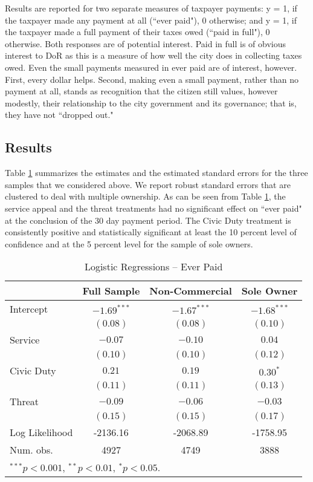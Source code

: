 \documentclass[12pt,titlepage]{article}
\begin{document}
Results are reported for two separate measures of taxpayer payments: y
= 1, if the taxpayer made any payment at all (``ever paid"), 0
otherwise; and y = 1, if the taxpayer made a full payment of their
taxes owed (``paid in full"), 0 otherwise.  Both responses are of
potential interest.  Paid in full is of obvious interest to DoR as
this is a measure of how well the city does in collecting taxes owed.
Even the small payments measured in ever paid are of interest,
however.  First, every dollar helps.  Second, making even a small
payment, rather than no payment at all, stands as recognition that the
citizen still values, however modestly, their relationship to the city
government and its governance; that is, they have not ``dropped out."

\subsection{Results}
  
Table \ref{XX} summarizes the estimates and the estimated standard
errors for the three samples that we considered above. We report robust
standard errors that are clustered to deal with multiple ownership. As
can be seen from Table \ref{XX}, the service appeal and the threat treatments
had no significant effect on ``ever paid" at the conclusion of the 30 day payment period.  The Civic Duty treatment is consistently positive and statistically significant at least the 10 percent level of confidence and at the 5 percent level for the sample of sole owners.  

  
\begin{table}[htbp]
\caption{Logistic Regressions -- Ever Paid}\label{XX}
\begin{center}
\begin{tabular}{| l |  c | c | c |}
\hline
               & Full Sample & Non-Commercial & Sole Owner \\
\hline
Intercept      & $-1.69^{***}$ & $-1.67^{***}$ & $-1.68^{***}$ \\
               & $(0.08)$      & $(0.08)$      & $(0.10)$      \\
Service          & $-0.07$       & $-0.10$       & $0.04$        \\
               & $(0.10)$      & $(0.10)$      & $(0.12)$      \\
Civic Duty           & $0.21$        & $0.19$        & $0.30^{*}$    \\
               & $(0.11)$      & $(0.11)$      & $(0.13)$      \\
Threat         & $-0.09$       & $-0.06$       & $-0.03$       \\
               & $(0.15)$      & $(0.15)$      & $(0.17)$      \\
\hline
Log Likelihood & -2136.16      & -2068.89      & -1758.95      \\
Num. obs.      & 4927          & 4749          & 3888          \\
\hline
\multicolumn{4}{l}{\scriptsize{$^{***}p<0.001$, $^{**}p<0.01$, $^*p<0.05$.}}
\end{tabular}
\end{center}
\end{table}
\end{document}
